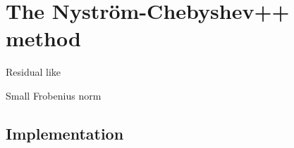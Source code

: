 \chapter{The Nystr\"om-Chebyshev++ method}
\label{chp:4-nystromchebyshev}


Residual like \cite{meyer2021hutch}

Small Frobenius norm


\section{Implementation}
\label{sec:4-nystromchebyshev-implementation}


